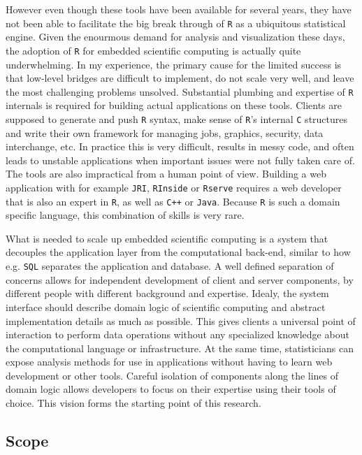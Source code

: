 \documentclass{article}
\newcommand{\R}{\texttt{R}\xspace}
\begin{document}
However even though these tools have been available for several years, they have not been able to facilitate the big break through of \R as a ubiquitous statistical engine. Given the enourmous demand for analysis and visualization these days, the adoption of \R for embedded scientific computing is actually quite underwhelming. In my experience, the primary cause for the limited success is that low-level bridges are difficult to implement, do not scale very well, and leave the most challenging problems unsolved. Substantial plumbing and expertise of \R internals is required for building actual applications on these tools. Clients are supposed to generate and push \R syntax, make sense of \R's internal \texttt{C} structures and write their own framework for managing jobs, graphics, security, data interchange, etc. In practice this is very difficult, results in messy code, and often leads to unstable applications when important issues were not fully taken care of. The tools are also impractical from a human point of view. Building a web application with for example \texttt{JRI}, \texttt{RInside} or \texttt{Rserve} requires a web developer that is also an expert in \R, as well as \texttt{C++} or \texttt{Java}. Because \R is such a domain specific language, this combination of skills is very rare. 

What is needed to scale up embedded scientific computing is a system that decouples the application layer from the computational back-end, similar to how e.g. \texttt{SQL} separates the application and database. A well defined separation of concerns allows for independent development of client and server components, by different people with different background and expertise. Idealy, the system interface should describe domain logic of scientific computing and abstract implementation details as much as possible. This gives clients a universal point of interaction to perform data operations without any specialized knowledge about the computational language or infrastructure. At the same time, statisticians can expose analysis methods for use in applications without having to learn web development or other tools. Careful isolation of components along the lines of domain logic allows developers to focus on their expertise using their tools of choice. This vision forms the starting point of this research. 


\subsection{Scope}
\end{document}
